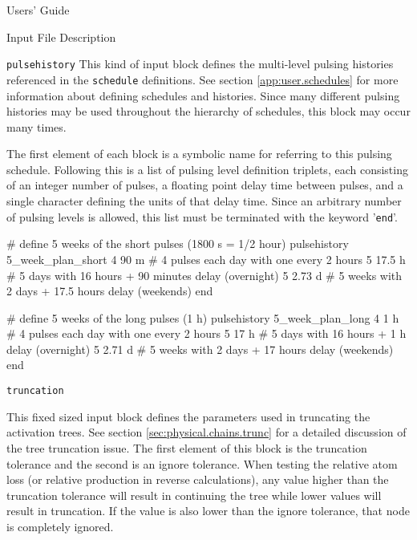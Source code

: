 \begin{chapter}{Users' Guide\label{app:user.guide}}
\begin{section}{Input File Description\label{app:user.input}}
\begin{subsection}{\texttt{pulsehistory}\label{app:user.input.pulse}}
      This kind of input block defines the multi-level pulsing
      histories referenced in the \texttt{schedule} definitions.  See
      section \ref{app:user.schedules} for more information about
      defining schedules and histories.  Since many different pulsing
      histories may be used throughout the hierarchy of schedules,
      this block may occur many times.

      The first element of each block is a symbolic name for referring
      to this pulsing schedule.  Following this is a list of pulsing
      level definition triplets, each consisting of an integer number
      of pulses, a floating point delay time between pulses, and a
      single character defining the units of that delay time.  Since
      an arbitrary number of pulsing levels is allowed, this list must
      be terminated with the keyword '\texttt{end}'.

      \begin{center}
        \renewcommand{\baselinestretch}{1}\normalsize
        \begin{boxedverbatim}
# define 5 weeks of the short pulses (1800 s = 1/2 hour)
pulsehistory 5_week_plan_short
   4  90 m   # 4 pulses each day with one every 2 hours
   5  17.5 h # 5 days with 16 hours + 90 minutes delay (overnight)
   5  2.73 d # 5 weeks with 2 days + 17.5 hours delay (weekends)
end

# define 5 weeks of the long pulses (1 h)
pulsehistory 5_week_plan_long
   4  1 h    # 4 pulses each day with one every 2 hours
   5  17 h   # 5 days with 16 hours + 1 h delay (overnight)
   5  2.71 d # 5 weeks with 2 days + 17 hours delay (weekends)
end
\end{boxedverbatim}
      \end{center}

    \end{subsection}

    \begin{subsection}{\texttt{truncation}\label{app:user.input.trunc}}
      
      This fixed sized input block defines the parameters used in
      truncating the activation trees.  See section
      \ref{sec:physical.chains.trunc} for a detailed discussion of the
      tree truncation issue.  The first element of this block is the
      truncation tolerance and the second is an ignore tolerance.
      When testing the relative atom loss (or relative production in
      reverse calculations), any value higher than the truncation
      tolerance will result in continuing the tree while lower values
      will result in truncation.  If the value is also lower than the
      ignore tolerance, that node is completely ignored.


\end{subsection}
\end{section}
\end{chapter}
